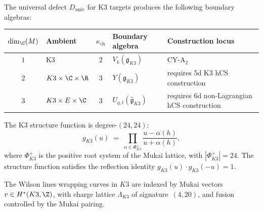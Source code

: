 \begin{conjecture}
\label{conj:cp-k3-defect-hierarchy}
\ClaimStatusConjectured
The universal defect $D_{\mathrm{univ}}$ for K3 targets produces the following boundary algebras:
\begin{center}
\small
\renewcommand{\arraystretch}{1.2}
\begin{tabular}{clcll}
\toprule
$\dim_\C(M)$ & Ambient & $\kappa_{\mathrm{ch}}$ & Boundary algebra & Construction locus \\
\midrule
$1$ & K3 & $2$ & $V_k(\mathfrak{g}_{K3})$ & CY-A$_2$ \\
$2$ & $K3 \times \C \times \R$ & $3$ & $Y(\mathfrak{g}_{K3})$ & requires 5d K3 hCS construction \\
$3$ & $K3 \times E \times \C$ & $3$ & $U_{q,t}(\widehat{\mathfrak{g}}_{K3})$ & requires 6d non-Lagrangian hCS construction \\
\bottomrule
\end{tabular}
\end{center}
The K3 structure function is degree-$(24, 24)$:
\[
 g_{K3}(u) \;=\; \prod_{\alpha \in \Phi_{K3}^+} \frac{u - \alpha(h)}{u + \alpha(h)},
\]
where $\Phi_{K3}^+$ is the positive root system of the Mukai lattice, with $|\Phi_{K3}^+| = 24$. The structure function satisfies the reflection identity $g_{K3}(u) \cdot g_{K3}(-u) = 1$.

The Wilson lines wrapping curves in $K3$ are indexed by Mukai vectors $v \in H^*(K3, \Z)$, with charge lattice $\Lambda_{K3}$ of signature~$(4, 20)$, and fusion controlled by the Mukai pairing.


\end{conjecture}
